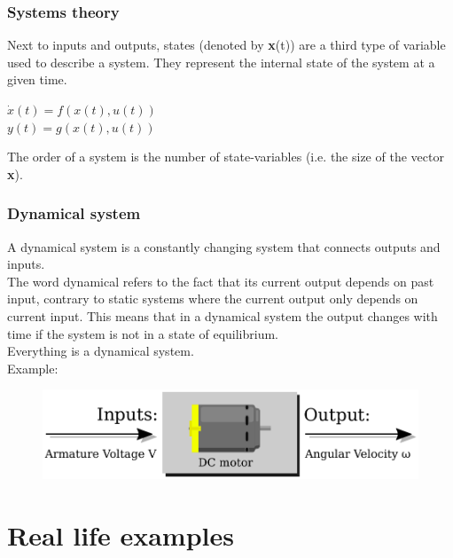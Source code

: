 \documentclass{beamer}
\begin{document}

\begin{frame}
\frametitle{Systems theory}
Next to inputs and outputs, states (denoted by \textbf x(t)) are a third type of variable used to describe a system. They represent the internal state of the system at a given time.\\
\begin{center}
$\dot{x}(t) = f(x(t),u(t))$\\
$y(t) = g(x(t),u(t))$\\
\end{center}
The order of a system is the number of state-variables (i.e. the size of the vector \textbf x).\\
\bigskip
\end{frame}


\begin{frame}
\frametitle{Dynamical system}
A dynamical system is a constantly changing system that connects outputs and inputs.\\The word dynamical refers to the fact that its current output depends on past input, contrary to static systems where the current output only depends on current input. This means that in a dynamical system the output changes with time if the system is not in a state of equilibrium.\\
\medskip
Everything is a dynamical system.\\
Example:\\
\begin{figure}
\includegraphics[width=0.7\linewidth]{dc_motor}
\end{figure}
\end{frame}

\section{Real life examples} 
\end{document}
